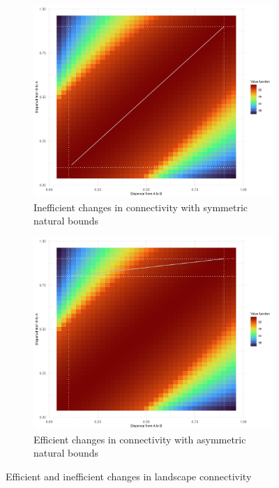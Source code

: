 \begin{figure}[htbp]
    \centering
    \begin{subfigure}{0.45\textwidth}
        \centering
        \includegraphics[width=\textwidth]{figures/fences/heatmap_with_symmetric_dispersal_large.jpg}
        \caption{Inefficient changes in connectivity with symmetric natural bounds}
        \label{fig:figure1}
    \end{subfigure}
    \hfill
    \begin{subfigure}{0.45\textwidth}
        \centering
        \includegraphics[width=\textwidth]{figures/fences/heatmap_with_asymmetric_dispersal.jpg}
        \caption{Efficient changes in connectivity with asymmetric natural bounds}
        \label{fig:figure2}
    \end{subfigure}
    \caption{Efficient and inefficient changes in landscape connectivity}
    \label{fig:overall}
\end{figure}

